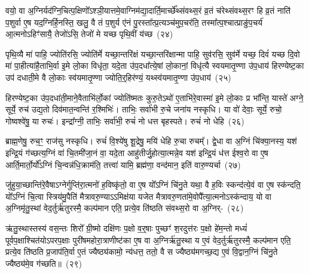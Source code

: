 वयो॒ वा अ॒ग्निर्यद॑ग्नि॒चित्प॒क्षिणो᳚\-ऽश्ञी॒यात्तमे॒वाग्निम॑द्या॒दार्ति॒मार्च्छे᳚थ्संवथ्स॒रं व्र॒तं च॑रेथ्संवथ्स॒रꣳ हि व्र॒तं नाति॑ प॒शुर्वा ए॒ष यद॒ग्निर्\mbox{}हि॒नस्ति॒ खलु॒ वै तं प॒शुर्य ए॑नं पु॒रस्ता᳚त्प्र॒त्यञ्च॑मुप॒चर॑ति॒ तस्मा᳚त्प॒श्चात्प्राङु॑प॒चर्य॑ आ॒त्मनो\-ऽहिꣳ॑सायै॒ तेजो॑\-ऽसि॒ तेजो॑ मे यच्छ पृथि॒वीं य॑च्छ~(२४)\ip

पृथि॒व्यै मा॑ पाहि॒ ज्योति॑रसि॒ ज्योति॑र्मे यच्छा॒न्तरि॑क्षं यच्छा॒न्तरि॑क्षान्मा पाहि॒ सुव॑रसि॒ सुव॑र्मे यच्छ॒ दिवं॑ यच्छ दि॒वो मा॑ पा॒हीत्या॑है॒ताभि॒र्वा इ॒मे लो॒का विधृ॑ता॒ यदे॒ता उ॑प॒दधा᳚त्ये॒षां लो॒कानां॒ विधृ॑त्यै स्वयमा\-तृ॒ण्णा उ॑प॒धाय॑ हिरण्येष्ट॒का उप॑ दधाती॒मे वै लो॒काः स्व॑यमातृ॒ण्णा ज्योति॒र्॒\mbox{}हिर॑ण्यं॒ यथ्स्व॑यमातृ॒ण्णा उ॑प॒धाय॑~(२५)\ip

हिरण्येष्ट॒का उ॑प॒\-दधा॑ती॒माने॒वैताभि॑र्लो॒कां ज्योति॑ष्मतः कुरु॒ते\-ऽथो॑ ए॒ताभि॑रे॒वास्मा॑ इ॒मे लो॒काः प्र भा᳚न्ति॒ यास्ते॑ अग्ने॒ सूर्ये॒ रुच॑ उद्य॒तो दिव॑मात॒न्वन्ति॑ र॒श्मिभिः॑। ताभिः॒ सर्वा॑भी रु॒चे जना॑य नस्कृधि। या वो॑ देवाः॒ सूर्ये॒ रुचो॒ गोष्वश्वे॑षु॒ या रुचः॑। इन्द्रा᳚ग्नी॒ ताभिः॒ सर्वा॑भी॒ रुचं॑ नो धत्त बृहस्पते। रुचं॑ नो धेहि~(२६)\ip

ब्राह्म॒णेषु॒ रुच॒ꣳ॒ राज॑सु नस्कृधि। रुचं॑ वि॒श्ये॑षु शू॒द्रेषु॒ मयि॑ धेहि रु॒चा रुचम्᳚। द्वे॒धा वा अ॒ग्निं चि॑क्या॒नस्य॒ यश॑ इन्द्रि॒यं ग॑च्छत्य॒ग्निं वा॑ चि॒तमी॑जा॒नं वा॒ यदे॒ता आहु॑तीर्जु॒होत्या॒त्मन्ने॒व यश॑ इन्द्रि॒यं ध॑त्त ईश्व॒रो वा ए॒ष आर्ति॒मार्तो॒र्यो᳚\-ऽग्निं चि॒न्वन्न॑धि॒क्राम॑ति॒ तत्त्वा॑ यामि॒ ब्रह्म॑णा॒ वन्द॑मान॒ इति॑ वारु॒ण्यर्चा~(२७)\ip

जु॑हुया॒च्छान्ति॑रे॒वैषा\-ऽग्नेर्गुप्ति॑रा॒त्मनो॑ ह॒विष्कृ॑तो॒ वा ए॒ष यो᳚\-ऽग्निं चि॑नु॒ते यथा॒ वै ह॒विः स्कन्द॑त्ये॒वं वा ए॒ष स्क॑न्दति॒ यो᳚\-ऽग्निं चि॒त्वा स्त्रिय॑मु॒पैति॑ मैत्रावरु॒ण्या\-ऽऽमिक्ष॑या यजेत मैत्रावरु॒णता॑मे॒वोपै᳚त्या॒त्मनो\-ऽस्क॑न्दाय॒ यो वा अ॒ग्निमृ॑तु॒स्थां वेद॒र्तुर्\mbox{}ऋ॑तुरस्मै॒ कल्प॑मान एति॒ प्रत्ये॒व ति॑ष्ठति संवथ्स॒रो वा अ॒ग्निर्-~(२८)\ip

ऋ॑तु॒स्थास्तस्य॑ वस॒न्तः शिरो᳚ ग्री॒ष्मो दक्षि॑णः प॒क्षो व॒र्॒\mbox{}षाः पुच्छꣳ॑ श॒रदुत्त॑रः प॒क्षो हे॑म॒न्तो मध्यं॑ पूर्वप॒क्षाश्चित॑यो\-ऽपरप॒क्षाः पुरी॑षमहोरा॒त्राणीष्ट॑का ए॒ष वा अ॒ग्निर्\mbox{}ऋ॑तु॒स्था य ए॒वं वेद॒र्तुर्\mbox{}ऋ॑तुरस्मै॒ कल्प॑मान एति॒ प्रत्ये॒व ति॑ष्ठति प्र॒जा\-प॑ति॒र्वा ए॒तं ज्यैष्ठ्य॑कामो॒ न्य॑धत्त॒ ततो॒ वै स ज्यैष्ठ्य॑मगच्छ॒द्य ए॒वं वि॒द्वान॒ग्निं चि॑नु॒ते ज्यैष्ठ्य॑मे॒व ग॑च्छति॥~(२९)\ip

{\anuvakamend[{पृ॒थि॒वीं य॑च्छ॒ यथ्स्व॑यमातृ॒ण्णा उ॑प॒धाय॑ धेह्यृ॒चाग्निश्चि॑नु॒ते त्रीणि॑ च}]}

